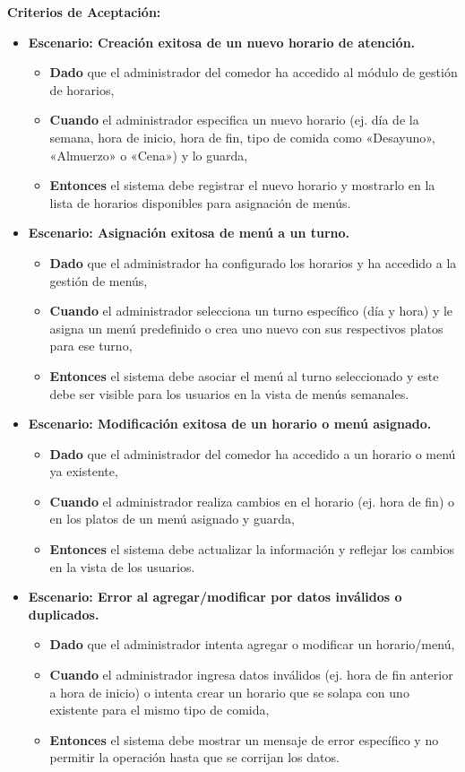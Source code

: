 \documentclass[12pt]{article}
\begin{document}
\textbf{Criterios de Aceptación:}
\begin{itemize}
	\item \textbf{Escenario: Creación exitosa de un nuevo horario de atención.}
	\begin{itemize}
		\item \textbf{Dado} que el administrador del comedor ha accedido al módulo de gestión de horarios,
		\item \textbf{Cuando} el administrador especifica un nuevo horario (ej. día de la semana, hora de inicio, hora de fin, tipo de comida como «Desayuno», «Almuerzo» o «Cena») y lo guarda,
		\item \textbf{Entonces} el sistema debe registrar el nuevo horario y mostrarlo en la lista de horarios disponibles para asignación de menús.
	\end{itemize}

	\item \textbf{Escenario: Asignación exitosa de menú a un turno.}
	\begin{itemize}
		\item \textbf{Dado} que el administrador ha configurado los horarios y ha accedido a la gestión de menús,
		\item \textbf{Cuando} el administrador selecciona un turno específico (día y hora) y le asigna un menú predefinido o crea uno nuevo con sus respectivos platos para ese turno,
		\item \textbf{Entonces} el sistema debe asociar el menú al turno seleccionado y este debe ser visible para los usuarios en la vista de menús semanales.
	\end{itemize}

	\item \textbf{Escenario: Modificación exitosa de un horario o menú asignado.}
	\begin{itemize}
		\item \textbf{Dado} que el administrador del comedor ha accedido a un horario o menú ya existente,
		\item \textbf{Cuando} el administrador realiza cambios en el horario (ej. hora de fin) o en los platos de un menú asignado y guarda,
		\item \textbf{Entonces} el sistema debe actualizar la información y reflejar los cambios en la vista de los usuarios.
	\end{itemize}

	\item \textbf{Escenario: Error al agregar/modificar por datos inválidos o duplicados.}
	\begin{itemize}
		\item \textbf{Dado} que el administrador intenta agregar o modificar un horario/menú,
		\item \textbf{Cuando} el administrador ingresa datos inválidos (ej. hora de fin anterior a hora de inicio) o intenta crear un horario que se solapa con uno existente para el mismo tipo de comida,
		\item \textbf{Entonces} el sistema debe mostrar un mensaje de error específico y no permitir la operación hasta que se corrijan los datos.
	\end{itemize}
\end{itemize}
\end{document}
